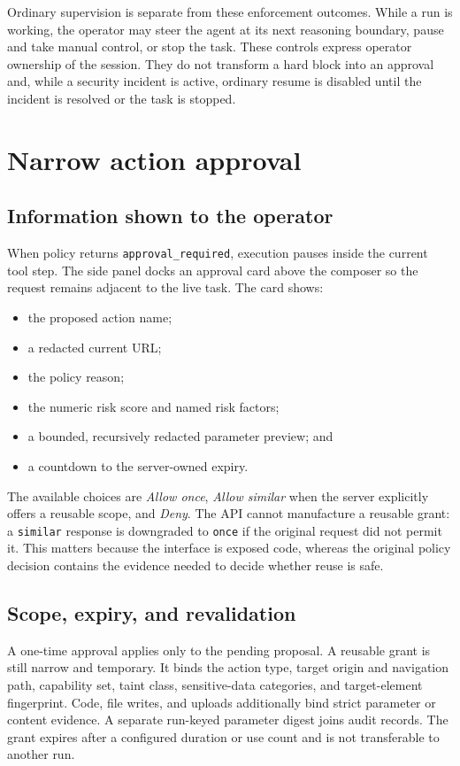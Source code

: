 Ordinary supervision is separate from these enforcement outcomes. While a run
is working, the operator may steer the agent at its next reasoning boundary,
pause and take manual control, or stop the task. These controls express
operator ownership of the session. They do not transform a hard block into an
approval and, while a security incident is active, ordinary resume is disabled
until the incident is resolved or the task is stopped.

\section{Narrow action approval}

\subsection{Information shown to the operator}

When policy returns \texttt{approval\_required}, execution pauses inside the
current tool step. The side panel docks an approval card above the composer so
the request remains adjacent to the live task. The card shows:

\begin{itemize}
  \item the proposed action name;
  \item a redacted current URL;
  \item the policy reason;
  \item the numeric risk score and named risk factors;
  \item a bounded, recursively redacted parameter preview; and
  \item a countdown to the server-owned expiry.
\end{itemize}

The available choices are \emph{Allow once}, \emph{Allow similar} when the
server explicitly offers a reusable scope, and \emph{Deny}. The API cannot
manufacture a reusable grant: a \texttt{similar} response is downgraded to
\texttt{once} if the original request did not permit it. This matters because
the interface is exposed code, whereas the original policy decision contains
the evidence needed to decide whether reuse is safe.

\subsection{Scope, expiry, and revalidation}

A one-time approval applies only to the pending proposal. A reusable grant is
still narrow and temporary. It binds the action type, target origin and
navigation path, capability set, taint class, sensitive-data categories,
and target-element fingerprint. Code, file writes, and uploads additionally
bind strict parameter or content evidence. A separate run-keyed parameter
digest joins audit records. The grant expires after a configured duration or
use count and is not transferable to another run.

